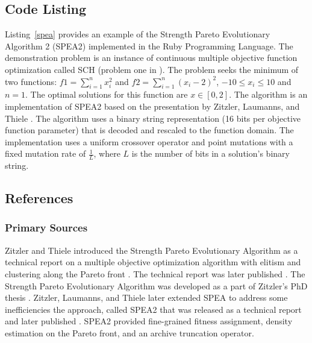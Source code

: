 \subsection{Code Listing}
Listing~\ref{spea} provides an example of the Strength Pareto Evolutionary Algorithm 2 (SPEA2) implemented in the Ruby Programming Language.
The demonstration problem is an instance of continuous multiple objective function optimization called SCH (problem one in \cite{Deb2002}). The problem seeks the minimum of two functions: $f1=\sum_{i=1}^n x_{i}^2$ and $f2=\sum_{i=1}^n (x_{i}-2)^2$, $-10\leq x_i \leq 10$ and $n=1$. The optimal solutions for this function are $x \in [0,2]$.
The algorithm is an implementation of SPEA2 based on the presentation by Zitzler, Laumanns, and Thiele \cite{Zitzler2002}.
The algorithm uses a binary string representation (16 bits per objective function parameter) that is decoded and rescaled to the function domain. The implementation uses a uniform crossover operator and point mutations with a fixed mutation rate of $\frac{1}{L}$, where $L$ is the number of bits in a solution's binary string. 



\subsection{References}

% 
% 
\subsubsection{Primary Sources}
Zitzler and Thiele introduced the Strength Pareto Evolutionary Algorithm as a technical report on a multiple objective optimization algorithm with elitism and clustering along the Pareto front \cite{Zitzler1998}. The technical report was later published \cite{Zitzler1999}.
The Strength Pareto Evolutionary Algorithm was developed as a part of Zitzler's PhD thesis \cite{Zitzler1999a}.
Zitzler, Laumanns, and Thiele later extended SPEA to address some inefficiencies the approach, called SPEA2 that was released as a technical report \cite{Zitzler2001} and later published \cite{Zitzler2002}. SPEA2 provided fine-grained fitness assignment, density estimation on the Pareto front, and an archive truncation operator.

